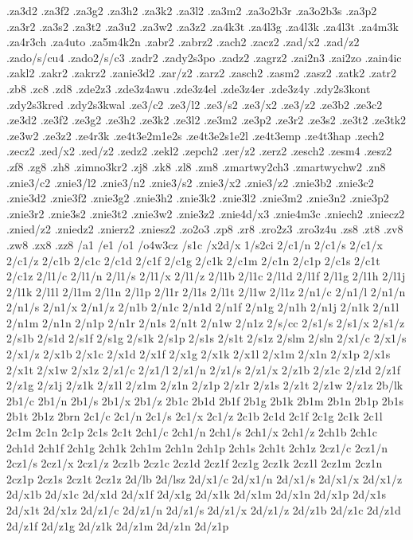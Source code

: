 {.za3d2
.za3f2
.za3g2
.za3h2
.za3k2
.za3l2
.za3m2
.za3o2b3r
.za3o2b3s
.za3p2
.za3r2
.za3s2
.za3t2
.za3u2
.za3w2
.za3z2
.za4k3t
.za4l3g
.za4l3k
.za4l3t
.za4m3k
.za4r3ch
.za4uto
.za5m4k2n
.zabr2
.zabrz2
.zach2
.zacz2
.zad/x2
.zad/z2
.zado/s/cu4
.zado2/s/c3
.zadr2
.zady2s3po
.zadz2
.zagrz2
.zai2n3
.zai2zo
.zain4ic
.zakl2
.zakr2
.zakrz2
.zanie3d2
.zar/z2
.zarz2
.zasch2
.zasm2
.zasz2
.zatk2
.zatr2
.zb8
.zc8
.zd8
.zde2z3
.zde3z4awu
.zde3z4el
.zde3z4er
.zde3z4y
.zdy2s3kont
.zdy2s3kred
.zdy2s3kwal
.ze3/c2
.ze3/l2
.ze3/s2
.ze3/x2
.ze3/z2
.ze3b2
.ze3c2
.ze3d2
.ze3f2
.ze3g2
.ze3h2
.ze3k2
.ze3l2
.ze3m2
.ze3p2
.ze3r2
.ze3s2
.ze3t2
.ze3tk2
.ze3w2
.ze3z2
.ze4r3k
.ze4t3e2m1e2s
.ze4t3e2s1e2l
.ze4t3emp
.ze4t3hap
.zech2
.zecz2
.zed/x2
.zed/z2
.zedz2
.zekl2
.zepch2
.zer/z2
.zerz2
.zesch2
.zesm4
.zesz2
.zf8
.zg8
.zh8
.zimno3kr2
.zj8
.zk8
.zl8
.zm8
.zmartwy2ch3
.zmartwychw2
.zn8
.znie3/c2
.znie3/l2
.znie3/n2
.znie3/s2
.znie3/x2
.znie3/z2
.znie3b2
.znie3c2
.znie3d2
.znie3f2
.znie3g2
.znie3h2
.znie3k2
.znie3l2
.znie3m2
.znie3n2
.znie3p2
.znie3r2
.znie3s2
.znie3t2
.znie3w2
.znie3z2
.znie4d/x3
.znie4m3c
.zniech2
.zniecz2
.znied/z2
.zniedz2
.znierz2
.zniesz2
.zo2o3
.zp8
.zr8
.zro2z3
.zro3z4u
.zs8
.zt8
.zv8
.zw8
.zx8
.zz8
/a1
/e1
/o1
/o4w3cz
/s1c
/x2d/x
1/s2ci
2/c1/n
2/c1/s
2/c1/x
2/c1/z
2/c1b
2/c1c
2/c1d
2/c1f
2/c1g
2/c1k
2/c1m
2/c1n
2/c1p
2/c1s
2/c1t
2/c1z
2/l1/c
2/l1/n
2/l1/s
2/l1/x
2/l1/z
2/l1b
2/l1c
2/l1d
2/l1f
2/l1g
2/l1h
2/l1j
2/l1k
2/l1l
2/l1m
2/l1n
2/l1p
2/l1r
2/l1s
2/l1t
2/l1w
2/l1z
2/n1/c
2/n1/l
2/n1/n
2/n1/s
2/n1/x
2/n1/z
2/n1b
2/n1c
2/n1d
2/n1f
2/n1g
2/n1h
2/n1j
2/n1k
2/n1l
2/n1m
2/n1n
2/n1p
2/n1r
2/n1s
2/n1t
2/n1w
2/n1z
2/s/cc
2/s1/s
2/s1/x
2/s1/z
2/s1b
2/s1d
2/s1f
2/s1g
2/s1k
2/s1p
2/s1s
2/s1t
2/s1z
2/slm
2/sln
2/x1/c
2/x1/s
2/x1/z
2/x1b
2/x1c
2/x1d
2/x1f
2/x1g
2/x1k
2/x1l
2/x1m
2/x1n
2/x1p
2/x1s
2/x1t
2/x1w
2/x1z
2/z1/c
2/z1/l
2/z1/n
2/z1/s
2/z1/x
2/z1b
2/z1c
2/z1d
2/z1f
2/z1g
2/z1j
2/z1k
2/z1l
2/z1m
2/z1n
2/z1p
2/z1r
2/z1s
2/z1t
2/z1w
2/z1z
2b/lk
2b1/c
2b1/n
2b1/s
2b1/x
2b1/z
2b1c
2b1d
2b1f
2b1g
2b1k
2b1m
2b1n
2b1p
2b1s
2b1t
2b1z
2brn
2c1/c
2c1/n
2c1/s
2c1/x
2c1/z
2c1b
2c1d
2c1f
2c1g
2c1k
2c1l
2c1m
2c1n
2c1p
2c1s
2c1t
2ch1/c
2ch1/n
2ch1/s
2ch1/x
2ch1/z
2ch1b
2ch1c
2ch1d
2ch1f
2ch1g
2ch1k
2ch1m
2ch1n
2ch1p
2ch1s
2ch1t
2ch1z
2cz1/c
2cz1/n
2cz1/s
2cz1/x
2cz1/z
2cz1b
2cz1c
2cz1d
2cz1f
2cz1g
2cz1k
2cz1l
2cz1m
2cz1n
2cz1p
2cz1s
2cz1t
2cz1z
2d/lb
2d/lsz
2d/x1/c
2d/x1/n
2d/x1/s
2d/x1/x
2d/x1/z
2d/x1b
2d/x1c
2d/x1d
2d/x1f
2d/x1g
2d/x1k
2d/x1m
2d/x1n
2d/x1p
2d/x1s
2d/x1t
2d/x1z
2d/z1/c
2d/z1/n
2d/z1/s
2d/z1/x
2d/z1/z
2d/z1b
2d/z1c
2d/z1d
2d/z1f
2d/z1g
2d/z1k
2d/z1m
2d/z1n
2d/z1p
}
